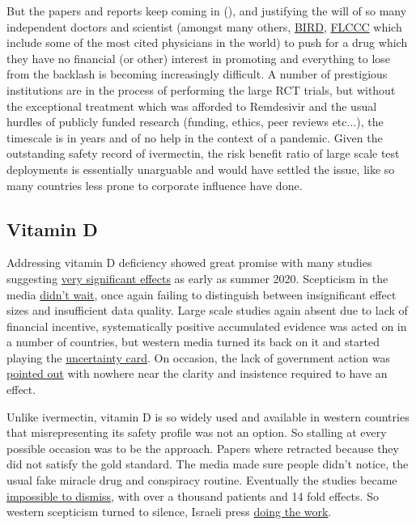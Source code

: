 \documentclass[11pt,a4paper]{article}
\begin{document}
But the papers and reports keep coming in (\cite{Bryant2021-ww}), and justifying the will of so many independent doctors and scientist (amongst many others, \href{Bryant2021-ww}{BIRD}, \href{https://covid19criticalcare.com/ivermectin-in-covid-19/}{FLCCC} which include some of the most cited physicians in the world) to push for a drug which they have no financial (or other) interest in promoting and everything to lose from the backlash is becoming increasingly difficult. A number of prestigious institutions are in the process of performing the large RCT trials, but without the exceptional treatment which was afforded to Remdesivir and the usual hurdles of publicly funded research (funding, ethics, peer reviews etc...), the timescale is in years and of no help in the context of a pandemic. Given the outstanding safety record of ivermectin, the risk benefit ratio of large scale test deployments is essentially unarguable and would have settled the issue, like so many countries less prone to corporate influence have done.

\subsection*{Vitamin D}

Addressing vitamin D deficiency showed great promise with many studies suggesting \href{https://c19vitamind.com/}{very significant effects} as early as summer 2020. Scepticism in the media \href{https://www.theguardian.com/world/2020/jun/29/no-evidence-that-taking-vitamin-d-prevents-coronavirus-say-experts}{didn't wait}, once again failing to distinguish between insignificant effect sizes and insufficient data quality. Large scale studies again absent due to lack of financial incentive, systematically positive accumulated evidence was acted on in a number of countries, but western media turned its back on it and started playing the \href{https://www.theguardian.com/world/2021/mar/09/vitamin-d-supplements-may-offer-no-covid-benefits-data-suggests}{uncertainty card}. On occasion, the lack of government action was \href{https://www.theguardian.com/lifeandstyle/2021/jan/10/does-vitamin-d-combat-covid}{pointed out} with nowhere near the clarity and insistence required to have an effect.

Unlike ivermectin, vitamin D is so widely used and available in western countries that misrepresenting its safety profile was not an option. So stalling at every possible occasion was to be the approach. Papers where retracted because they did not satisfy the gold standard. The media made sure people didn't notice, the usual fake miracle drug and conspiracy routine. Eventually the studies became \href{https://journals.plos.org/plosone/article?id=10.1371/journal.pone.0263069}{impossible to dismiss}, with over a thousand patients and 14 fold effects. So western scepticism turned to silence, Israeli press \href{https://www.timesofisrael.com/israeli-study-offers-strongest-proof-yet-of-vitamin-ds-power-to-fight-covid/}{doing the work}. 
\end{document}
